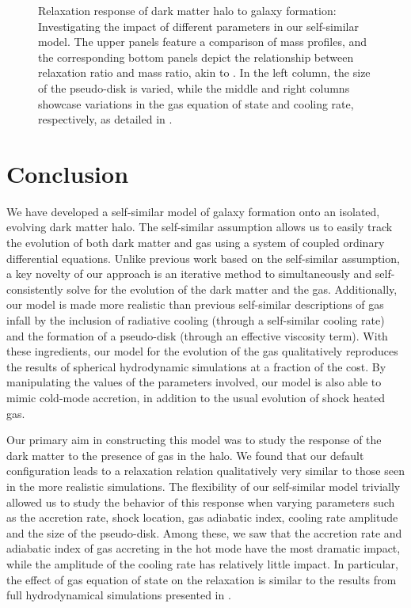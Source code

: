 \begin{figure}[htbp]
\caption{Relaxation response of dark matter halo to galaxy formation: Investigating the impact of different parameters in our self-similar model. The upper panels feature a comparison of mass profiles, and the corresponding bottom panels depict the relationship between relaxation ratio and mass ratio, akin to . In the left column, the size of the pseudo-disk is varied, while the middle and right columns showcase variations in the gas equation of state and cooling rate, respectively, as detailed in .}
\label{fig:relx_reln_all2-ch:ssr}
\end{figure}


\section{Conclusion}
\label{sec:conclusion-ch:ssr}
We have developed a self-similar model of galaxy formation onto an isolated, evolving dark matter halo. The self-similar assumption allows us to easily track the evolution of both dark matter and gas using a system of coupled ordinary differential equations. Unlike previous work based on the self-similar assumption, a key novelty of our approach is an iterative method to simultaneously and self-consistently solve for the evolution of the dark matter and the gas. Additionally, our model is made more realistic than previous self-similar descriptions of gas infall by the inclusion of radiative cooling (through a self-similar cooling rate) and the formation of a pseudo-disk (through an effective viscosity term). With these ingredients, our model for the evolution of the gas qualitatively reproduces the results of spherical hydrodynamic simulations at a fraction of the cost. By manipulating the values of the parameters involved, our model is also able to mimic cold-mode accretion, in addition to the usual evolution of shock heated gas.

Our primary aim in constructing this model was to study the response of the dark matter to the presence of gas in the halo. We found that our default configuration leads to a relaxation relation qualitatively very similar to those seen in the more realistic simulations. The flexibility of our self-similar model trivially allowed us to study the behavior of this response when varying parameters such as the accretion rate, shock location, gas adiabatic index, cooling rate amplitude and the size of the pseudo-disk. Among these, we saw that the accretion rate and adiabatic index of gas accreting in the hot mode have the most dramatic impact, while the amplitude of the cooling rate has relatively little impact. In particular, the effect of gas equation of state on the relaxation is similar to the results from full hydrodynamical simulations presented in .

